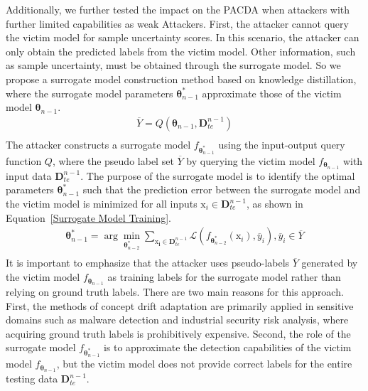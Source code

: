 \documentclass[conference,compsoc]{IEEEtran} %
\begin{document}
Additionally, we further tested the impact on the PACDA when attackers with further limited capabilities as weak Attackers.
First, the attacker cannot query the victim model for sample uncertainty scores. 
In this scenario, the attacker can only obtain the predicted labels from the victim model.
Other information, such as sample uncertainty, must be obtained through the surrogate model.
So we propose a surrogate model construction method based on knowledge distillation, where the surrogate model  parameters $\bm{\theta}_{n-1}^{*}$ approximate those of the victim model $\bm{\theta}_{n-1}$.
\begin{equation}
	\begin{aligned}
			\overline{Y} = Q(\bm{\theta}_{n-1},\bm{D}_{te}^{n-1}) \\
		\end{aligned}
\end{equation}
The attacker constructs a surrogate model $f_{\bm{\theta}_{n-1}^{*}}$ using the input-output query function $Q$, where the pseudo label set $\overline{Y}$ by querying the victim model  $f_{\bm{\theta}_{n-1}}$ with input data $\bm{D}_{te}^{n-1}$.
The purpose of the surrogate model is to identify the optimal parameters $\bm{\theta}_{n-1}^{*}$ such that the prediction error between the surrogate model and the victim model is minimized for all inputs $\bm{\mathrm{x}}_{i} \in \bm{D}_{te}^{n-1}$, as shown in Equation~\ref{Surrogate Model Training}.
\begin{equation}
	\begin{aligned}
			\bm{\theta}_{n-1}^{*} = \arg\min_{\bm{\theta}_{n-2}^{*}} \sum_{\bm{\mathrm{x}_{i}} \in \bm{D}_{te}^{n-1}} \mathcal{L} \left( f_{\bm{\theta}_{n-2}^{*}}(\bm{\mathrm{x}}_{i}) , \overline{y}_{i}  \right),  \overline{y}_{i} \in \overline{Y} \\
		\end{aligned}
	\label{Surrogate Model Training}
\end{equation}
It is important to emphasize that the attacker uses pseudo-labels $\overline{Y}$ generated by the victim model $f_{\bm{\theta}_{n-1}}$ as training labels for the surrogate model rather than relying on ground truth labels.
There are two main reasons for this approach. 
First, the methods of concept drift adaptation are primarily applied in sensitive domains such as malware detection and industrial security risk analysis, where acquiring ground truth labels is prohibitively expensive.
Second, the role of the surrogate model $f_{\bm{\theta}_{n-1}^{*}}$ is to approximate the detection capabilities of the victim model $f_{\bm{\theta}_{n-1}}$, but the victim model does not provide correct labels for the entire testing data $\bm{D}_{te}^{n-1}$. 
\end{document}
